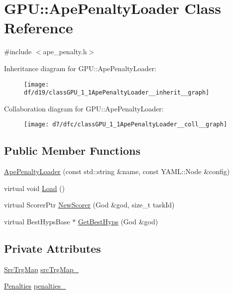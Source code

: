 \hypertarget{classGPU_1_1ApePenaltyLoader}{}\section{G\+PU\+:\+:Ape\+Penalty\+Loader Class Reference}
\label{classGPU_1_1ApePenaltyLoader}


{\ttfamily \#include $<$ape\+\_\+penalty.\+h$>$}



Inheritance diagram for G\+PU\+:\+:Ape\+Penalty\+Loader\+:
\nopagebreak
\begin{figure}[H]
\begin{center}
\leavevmode
\texttt{[image: df/d19/classGPU\_1\_1ApePenaltyLoader\_\_inherit\_\_graph]}
\end{center}
\end{figure}


Collaboration diagram for G\+PU\+:\+:Ape\+Penalty\+Loader\+:
\nopagebreak
\begin{figure}[H]
\begin{center}
\leavevmode
\texttt{[image: d7/dfc/classGPU\_1\_1ApePenaltyLoader\_\_coll\_\_graph]}
\end{center}
\end{figure}
\subsection*{Public Member Functions}
\begin{DoxyCompactItemize}
\item 
\hyperlink{classGPU_1_1ApePenaltyLoader_a52d521f7266ad349fc424454071a49a6}{Ape\+Penalty\+Loader} (const std\+::string \&name, const Y\+A\+M\+L\+::\+Node \&config)
\item 
virtual void \hyperlink{classGPU_1_1ApePenaltyLoader_a199d28a5d22439454cd82eee0e8760b9}{Load} ()
\item 
virtual Scorer\+Ptr \hyperlink{classGPU_1_1ApePenaltyLoader_a50bb804a177ac1080f02e545748a16ca}{New\+Scorer} (God \&god, size\+\_\+t task\+Id)
\item 
virtual Best\+Hyps\+Base $\ast$ \hyperlink{classGPU_1_1ApePenaltyLoader_a1a611c765715a3e2196d4021e0fd87b4}{Get\+Best\+Hyps} (God \&god)
\end{DoxyCompactItemize}
\subsection*{Private Attributes}
\begin{DoxyCompactItemize}
\item 
\hyperlink{namespaceGPU_af00d3987455a7200ce4556e53eb3d228}{Src\+Trg\+Map} \hyperlink{classGPU_1_1ApePenaltyLoader_ad309bdbdb941461e1385667fd2cb00eb}{src\+Trg\+Map\+\_\+}
\item 
\hyperlink{namespaceGPU_ac29cf59ddc71f2086318cc8a5b166269}{Penalties} \hyperlink{classGPU_1_1ApePenaltyLoader_a3d174adc7fd7f3b067e6bf48877ef30b}{penalties\+\_\+}
\end{DoxyCompactItemize}


